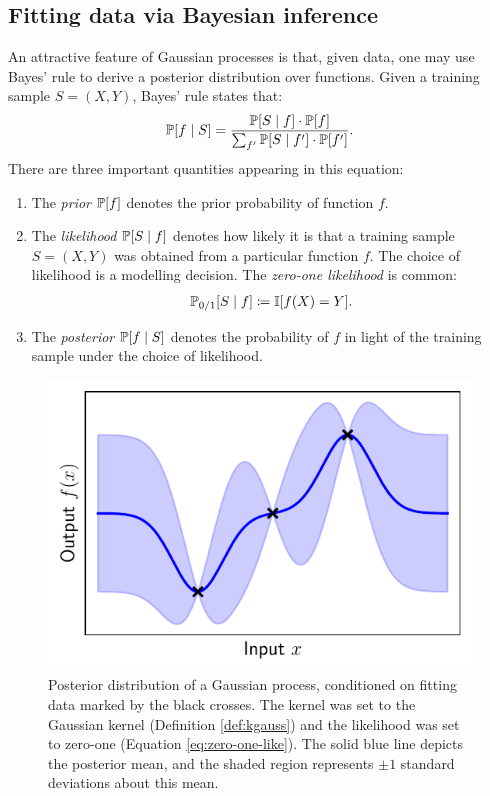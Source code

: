 \begin{refsection}
\subsection{Fitting data via Bayesian inference}

An attractive feature of Gaussian processes is that, given data, one may use Bayes' rule to derive a posterior distribution over functions. Given a training sample $S=(X,Y)$, Bayes' rule states that:
\begin{equation}\label{eq:bayes}
\mathbb{P}[f\mid S] = \frac{\mathbb{P}[S\mid f]\cdot \mathbb{P}[f]}{\sum_{f^\prime}\mathbb{P}[S\mid f^\prime]\cdot \mathbb{P}[f^\prime]}.
\end{equation}
There are three important quantities appearing in this equation:
\begin{enumerate}
    \item The \textit{prior} $\mathbb{P}[f]$ denotes the prior probability of function $f$.
    \item The \textit{likelihood} $\mathbb{P}[S\mid f]$ denotes how likely it is that a training sample $S=(X,Y)$ was obtained from a particular function $f$. The choice of likelihood is a modelling decision. The \textit{zero-one likelihood} is common:
    \begin{equation}\label{eq:zero-one-like}
        \mathbb{P}_{0/1}[S\mid f] \coloneqq \mathbb{I}[f(X) = Y].
    \end{equation}
    \item The \textit{posterior} $\mathbb{P}[f\mid S]$ denotes the probability of $f$ in light of the training sample under the choice of likelihood.
\end{enumerate}

\begin{figure}
    \centering
    \includegraphics{figures/gp-var.pdf}
    \caption[Posterior distribution of a Gaussian process]{Posterior distribution of a Gaussian process, conditioned on fitting data marked by the black crosses. The kernel was set to the Gaussian kernel (Definition \ref{def:kgauss}) and the likelihood was set to zero-one (Equation \ref{eq:zero-one-like}). The solid blue line depicts the posterior mean, and the shaded region represents $\pm 1$ standard deviations about this mean.}
    \label{fig:gp}
\end{figure}


\end{refsection}
